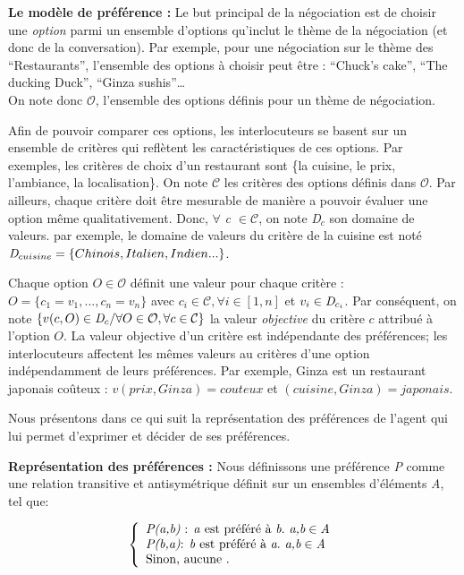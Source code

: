 \documentclass[a4paper,french]{article}
\begin{document}
\par \textbf{Le modèle de préférence :}
Le but principal de la négociation est de choisir une \emph{option} parmi un ensemble d'options qu'inclut le thème de la négociation (et donc de la conversation). Par exemple, pour une négociation sur le thème des ``Restaurants'', l'ensemble des options à choisir peut être : ``Chuck's cake'', ``The ducking Duck'', ``Ginza sushis''\ldots \\ On note donc $\mathcal{O}$, l'ensemble des options définis pour un thème de négociation. \par Afin de pouvoir  comparer ces options, les interlocuteurs se basent sur un ensemble de critères qui reflètent les caractéristiques de ces options. Par exemples, les critères de choix d'un restaurant sont \{la cuisine, le prix, l'ambiance, la localisation\}.  On note $\mathcal{C}$ les critères des options définis dans $\mathcal{O}$. Par ailleurs, chaque critère doit être mesurable de manière a pouvoir évaluer une option même qualitativement. Donc, $\forall$ \emph{c $\in\mathcal{ C}$},  on note \emph{D$_c$} son domaine de valeurs. par exemple, le domaine de valeurs du critère de la cuisine est noté $\emph{D}_{cuisine} = \{Chinois, Italien, Indien...\}$.

\par Chaque option $O\in \mathcal{O}$ définit une valeur pour chaque critère : 
$O = \{c_1=v_1,..., c_n=v_n\}$ avec $c_i \in \mathcal{C}, \forall i \in [1,n]$ et $v_i\in \emph{D}_{c_i}$. 
Par conséquent, on note $\{v(c,O) \in \emph{D}_{c} / \forall O \in \mathcal{O}, \forall c \in \mathcal{C}\}$ la valeur \emph{objective} du critère $c$ attribué à l'option $O$. La valeur objective d'un critère est indépendante des préférences; les interlocuteurs affectent les mêmes valeurs au critères d'une option indépendamment de leurs préférences. 
Par exemple, Ginza est un restaurant japonais coûteux : $v(prix, Ginza) = couteux $ et $(cuisine, Ginza) = japonais$. 

\par Nous présentons dans ce qui suit la représentation des préférences de l'agent qui lui permet d'exprimer et décider de ses préférences.
\\ \par \textbf{Représentation des préférences :}
Nous définissons une préférence \emph{P} comme une relation transitive et antisymétrique  définit sur un ensembles d'éléments \emph{A}, tel que:

\[ \left \{
\begin{array}{l}
\emph{P(a,b)} $ : \emph{a}  est préféré à $\emph{b}. \emph{ a,b} \in \emph{A}\\
\emph{P(b,a)} $:  \emph{b} est préféré à  $\emph{a}. \emph{ a,b} \in \emph{A}\\
$Sinon, aucune . $\\
\end{array}
\right .\]
\end{document}
